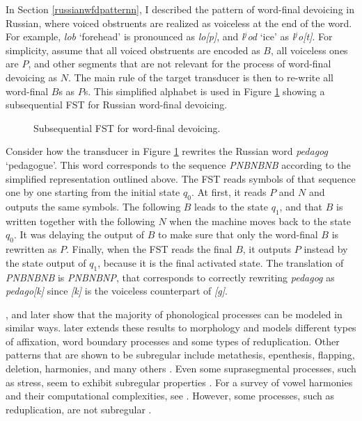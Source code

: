 In Section \ref{russianwfdpatternn}, I described the pattern of word-final devoicing in Russian, where voiced obstruents are realized as voiceless at the end of the word.
For example, \emph{lob} `forehead' is pronounced as \emph{lo[p]}, and \emph{l$^j$od} `ice' as \emph{l$^j$o[t]}.
For simplicity, assume that all voiced obstruents are encoded as $B$, all voiceless ones are $P$, and other segments that are not relevant for the process of word-final devoicing as $N$.
The main rule of the target transducer is then to re-write all word-final $B$s as $P$s.
This simplified alphabet is used in Figure \ref{ssqwfdddd} showing a subsequential FST for Russian word-final devoicing.


\begin{figure}[h!] 
\centering
{}
\caption{Subsequential FST for word-final devoicing.}
\label{ssqwfdddd}
\end{figure}

Consider how the transducer in Figure \ref{ssqwfdddd} rewrites the Russian word \emph{pedagog} `pedagogue'.
This word corresponds to the sequence  \emph{PNBNBNB} according to the simplified representation outlined above.
The FST reads symbols of that sequence one by one starting from the initial state $q_0$.
At first, it reads $P$ and $N$ and outputs the same symbols.
The following $B$ leads to the state $q_{1}$, and that $B$ is written together with the following $N$ when the machine moves back to the state $q_0$.
It was delaying the output of $B$ to make sure that only the word-final $B$ is rewritten as $P$.
Finally, when the FST reads the final $B$, it outputs $P$ instead by the state output of $q_{1}$, because it is the final activated state.
The translation of \emph{PNBNBNB} is \emph{PNBNBNP}, that corresponds to correctly rewriting \emph{pedagog} as \emph{pedago[k]} since \emph{[k]} is the voiceless counterpart of \emph{[g]}.


\cite{Chandlee2014}, and later \cite{ChandleeHeinz2018} show that the majority of phonological processes can be modeled in similar ways.
\cite{Chandlee2017} later extends these results to morphology and models different types of affixation, word boundary processes and some types of reduplication.
Other patterns that are shown to be subregular include metathesis, epenthesis, flapping, deletion, harmonies, and many others \citep{Chandlee2014}.
Even some suprasegmental processes, such as stress, seem to exhibit subregular properties \citep{RogersPres}.
For a survey of vowel harmonies and their computational complexities, see \citep{GainorLai12}.
However, some processes, such as reduplication, are not subregular \citep{DolatianHeinz2018}.


